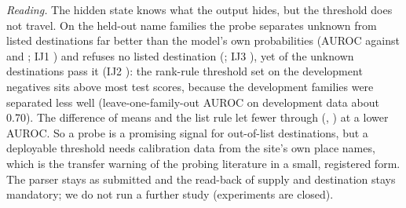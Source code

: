 \emph{Reading.} The hidden state knows what the output hides, but the threshold does not travel. On the held-out name families the probe separates unknown from listed destinations far better than the model's own probabilities (AUROC \IJProbeAuroc{} against \IJZeroShotAuroc{} and \IJPOtherAuroc; IJ1 \IJOneHolds) and refuses no listed destination (\IJProbeFalseRef; IJ3 \IJThreeHolds), yet \IJProbePass{} of the unknown destinations pass it (IJ2 \IJTwoHolds): the rank-rule threshold set on the development negatives sits above most test scores, because the development families were separated less well (leave-one-family-out AUROC on development data about 0.70). The difference of means and the list rule let fewer through (\IJDiffMeansPass, \IJListRulePass) at a lower AUROC. So a probe is a promising signal for out-of-list destinations, but a deployable threshold needs calibration data from the site's own place names, which is the transfer warning of the probing literature in a small, registered form. The parser stays as submitted and the read-back of supply and destination stays mandatory; we do not run a further study (experiments are closed).
